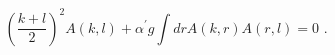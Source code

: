 \begin{equation}
\left(\frac{k+l}{2}\right)^2 A(k,l)+{\alpha^{\prime}} g \int dr
A(k,r)A(r,l)=0\,\,.
\end{equation}

